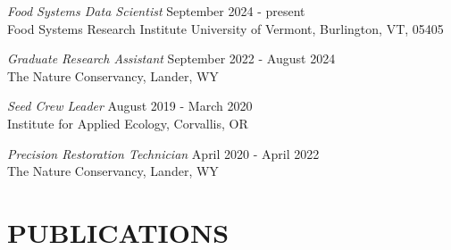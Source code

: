 \documentclass[margin, 10pt]{res} %
\begin{document}
\begin{resume}
{\sl Food Systems Data Scientist} \hfill September 2024 - present\\
Food Systems Research Institute
University of Vermont, Burlington, VT, 05405

{\sl Graduate Research Assistant} \hfill September 2022 - August 2024\\
The Nature Conservancy, Lander, WY

{\sl Seed Crew Leader} \hfill August 2019 - March 2020\\
Institute for Applied Ecology, Corvallis, OR

{\sl Precision Restoration Technician} \hfill April 2020 - April 2022\\
The Nature Conservancy, Lander, WY


\section{PUBLICATIONS}




\end{resume}
\end{document}
